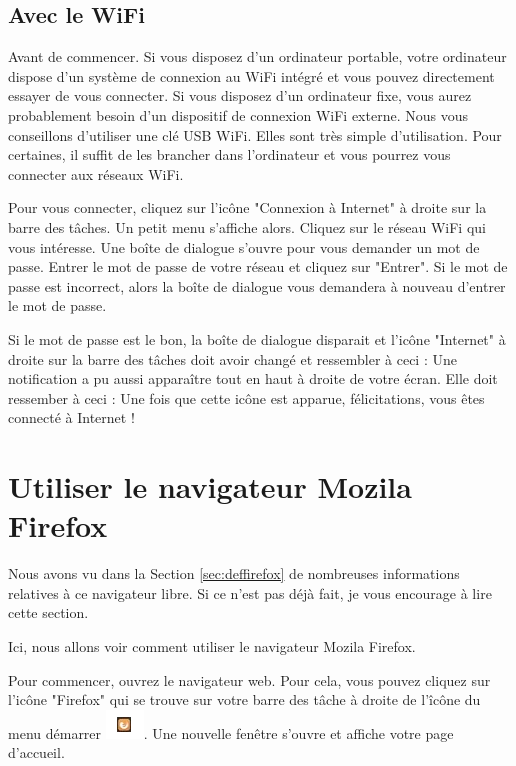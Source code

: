 \documentclass[12pt]{book}
\begin{document}
	\subsection{Avec le WiFi}
		Avant de commencer.
		Si vous disposez d'un ordinateur portable, votre ordinateur dispose d'un système de connexion au WiFi intégré et vous pouvez directement essayer de vous connecter.
		Si vous disposez d'un ordinateur fixe, vous aurez probablement besoin d'un dispositif de connexion WiFi externe.
		Nous vous conseillons d'utiliser une clé USB WiFi.
		Elles sont très simple d'utilisation.
		Pour certaines, il suffit de les brancher dans l'ordinateur et vous pourrez vous connecter aux réseaux WiFi.\par
		Pour vous connecter, cliquez sur l'icône "Connexion à Internet" à droite sur la barre des tâches.
		Un petit menu s'affiche alors.
		Cliquez sur le réseau WiFi qui vous intéresse.
		Une boîte de dialogue s'ouvre pour vous demander un mot de passe.
		Entrer le mot de passe de votre réseau et cliquez sur "Entrer".
		Si le mot de passe est incorrect, alors la boîte de dialogue vous demandera à nouveau d'entrer le mot de passe.\par
		Si le mot de passe est le bon, la boîte de dialogue disparait et l'icône "Internet" à droite sur la barre des tâches doit avoir changé et ressembler à ceci :
		\newline
		Une notification a pu aussi apparaître tout en haut à droite de votre écran.
		Elle doit ressember à ceci :
		\newline
		Une fois que cette icône est apparue, félicitations, vous êtes connecté à Internet !
\section{Utiliser le navigateur Mozila Firefox}\label{sec:utiliserfirefox}
	Nous avons vu dans la Section \ref{sec:deffirefox} de nombreuses informations relatives à ce navigateur libre.
	Si ce n'est pas déjà fait, je vous encourage à lire cette section.\par
	Ici, nous allons voir comment utiliser le navigateur Mozila Firefox.\par
	Pour commencer, ouvrez le navigateur web.
	Pour cela, vous pouvez cliquez sur l'icône "Firefox" qui se trouve sur votre barre des tâche à droite de l'îcône du menu démarrer 
		\includegraphics{include/icn_firefox.png}.
	Une nouvelle fenêtre s'ouvre et affiche votre page d'accueil.
\end{document}
